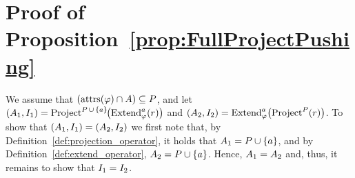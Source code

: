 \vspace{-2mm}

\section{Proof of Proposition~\ref{prop:FullProjectPushing}}
\label{appdx:proof}

\vspace{-1mm}

		We
	assume that $( \mathrm{attrs}(\varphi) \cap A ) \subseteq P$, and
	let $(A_1,I_1) = \text{Project}^{P \,\cup\, \{a\}\!}\bigl( \text{Extend}_{\varphi}^{a}(r) \bigr)$ and $(A_2,I_2) = \text{Extend}_{\varphi}^{a}\bigl( \text{Project}^{P}(r) \bigr)$.
	To show that $(A_1,I_1) = (A_2,I_2)$ we first note that, by Definition~\ref{def:projection_operator}, it holds that $A_1 = P \cup \{a\}$, and by Definition~\ref{def:extend_operator}, $A_2 = P \cup \{a\}$. Hence, $A_1 = A_2$ and, thus, it remains to show that $I_1 = I_2$.

